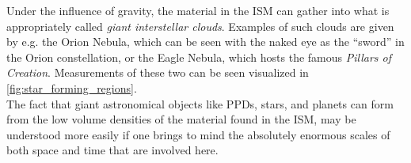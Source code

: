     Under the influence of gravity, the material in the ISM can gather into what is 
    appropriately called \textit{giant interstellar clouds}.
    Examples of such clouds are given by e.g. the Orion Nebula,
    which can be seen with the naked eye as the ``sword'' in the Orion constellation,
    or the Eagle Nebula, which hosts the famous \textit{Pillars of Creation}.
    Measurements of these two can be seen visualized in 
    \cref{fig:star_forming_regions}. \\

    The fact that giant astronomical objects like PPDs, stars, and planets can form from the 
    low volume densities of the material found in the ISM, may be understood more easily if one
    brings to mind the absolutely enormous scales of both space and time that are involved here. \\




